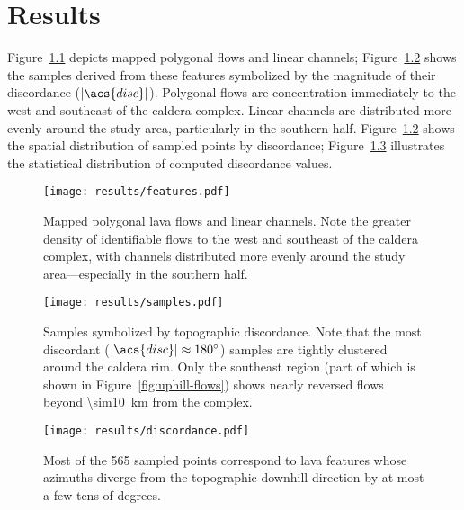 \chapter{Results}\label{cha:results}

Figure~\ref{fig:features} depicts mapped polygonal flows and linear channels; Figure~\ref{fig:samples} shows the samples derived from these features symbolized by the magnitude of their discordance ($|\acs{disc}|$). Polygonal flows are concentration immediately to the west and southeast of the caldera complex. Linear channels are distributed more evenly around the study area, particularly in the southern half. Figure~\ref{fig:samples} shows the spatial distribution of sampled points by discordance; Figure~\ref{fig:discordance} illustrates the statistical distribution of computed discordance values. 

\begin{figure}
    \texttt{[image: results/features.pdf]}%
    \caption[Mapped lava features]{Mapped polygonal lava flows and linear channels. Note the greater density of identifiable flows to the west and southeast of the caldera complex, with channels distributed more evenly around the study area---especially in the southern half.}%
    \label{fig:features}
\end{figure}

\begin{figure}
    \texttt{[image: results/samples.pdf]}%
    \caption[Spatial distribution of discordance]{Samples symbolized by topographic discordance. Note that the most discordant ($|\acs{disc}|\approx\ang{180}$) samples are tightly clustered around the caldera rim. Only the southeast region (part of which is shown in Figure~\ref{fig:uphill-flows}) shows nearly reversed flows beyond \qty{\sim10}{\km} from the complex.}%
    \label{fig:samples}
\end{figure}

\begin{figure}
    \texttt{[image: results/discordance.pdf]}%
    \caption[Statistical distribution of discordance]{Most of the 565 sampled points correspond to lava features whose azimuths diverge from the topographic downhill direction by at most a few tens of degrees.}%
    \label{fig:discordance}
\end{figure}

